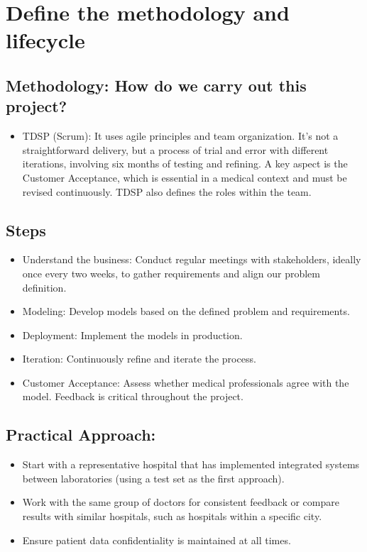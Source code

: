 \section{Define the methodology and lifecycle}\label{sec:define-the-methodology-and-lifecycle}

\subsection{Methodology: How do we carry out this project?}\label{subsec:methodology:how-do-we-carry-out-this-project}

\begin{itemize}
    \item TDSP (Scrum): It uses agile principles and team organization.
    It’s not a straightforward delivery, but a process of trial and error with different iterations, involving six months of testing and refining.
    A key aspect is the Customer Acceptance, which is essential in a medical context and must be revised continuously.
    TDSP also defines the roles within the team.
\end{itemize}

\subsection{Steps}\label{subsec:steps}

\begin{itemize}
    \item Understand the business: Conduct regular meetings with stakeholders, ideally once every two weeks, to gather requirements and align our problem definition.
    \item Modeling: Develop models based on the defined problem and requirements.
    \item Deployment: Implement the models in production.
    \item Iteration: Continuously refine and iterate the process.
    \item Customer Acceptance: Assess whether medical professionals agree with the model.
    Feedback is critical throughout the project.
\end{itemize}

\subsection{Practical Approach:}\label{subsec:practical-approach:}

\begin{itemize}
    \item Start with a representative hospital that has implemented integrated systems between laboratories (using a test set as the first approach).
    \item Work with the same group of doctors for consistent feedback or compare results with similar hospitals, such as hospitals within a specific city.
    \item Ensure patient data confidentiality is maintained at all times.
\end{itemize}

